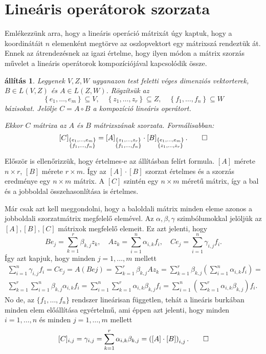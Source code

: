 \documentclass[9pt, a4paper, showtrims]{memoir}
\makeatletter
\renewenvironment{proof}[1][\proofname]
    {\par\pushQED{\qed}%
    \normalfont \topsep6\p@\@plus6\p@\relax
    \trivlist
    \item[\hskip\labelsep
        \itshape
    #1\@addpunct{:}]\ignorespaces}
    {\popQED\endtrivlist\@endpefalse}
\theoremstyle{plain}
\newtheorem{proposition}{állítás}[chapter]
\theoremstyle{remark}
\theoremstyle{definition}
\makeatother
\begin{document}
\section{Lineáris operátorok szorzata}
Emlékezzünk arra, hogy a lineáris operáció mátrixát úgy kaptuk, hogy a koordinátáit $n$ elemenként
megtörve az oszlopvektort egy mátrixszá rendeztük át.
Ennek az átrendezésnek az igazi értelme, hogy ilyen módon a mátrix szorzás művelet a lineáris operátorok kompozíciójával
kapcsolódik össze.
\begin{proposition}
	Legyenek $V,Z,W$ ugyanazon test feletti véges dimenziós vektorterek,
	$B \in L\left( V,Z \right)$ és $A \in L\left( Z,W \right)$.
	Rögzítsük az
	\[
		\left\{ e_1,\ldots,e_m \right\}\subseteq V,\quad
		\left\{ z_1,\ldots,z_r \right\}\subseteq Z,\quad
		\left\{ f_1,\ldots,f_n \right\}\subseteq W
	\]
	bázisokat.
	Jelölje $C=A\circ B$ a kompozíció lineáris operátort.

	Ekkor $C$ mátrixa az $A$ és $B$ mátrixszának szorzata.
	Formálisabban:
	\[
		\left[ C \right]_{\substack{\left\{ e_1,\ldots,e_m \right\}\\ \left\{ f_1,\ldots,f_n \right\}}}
		=
		\left[ A \right]_{\substack{\left\{ z_1,\ldots,z_r \right\}\\ \left\{ f_1,\ldots,f_n \right\}}}
		\cdot
		\left[ B \right]_{\substack{\left\{ e_1,\ldots,e_m \right\}\\ \left\{ z_1,\ldots,z_r \right\}}}.\qedhere
	\]
\end{proposition}
\begin{proof}
	Először is ellenőrizzük, hogy értelmes-e az állításban felírt formula.
	$\left[ A \right]$ mérete $n\times r$, $\left[ B \right]$ mérete $r\times m$.
	Így az $[A]\cdot[B]$ szorzat értelmes és a szorzás eredménye egy $n\times m$ mátrix.
	A $[C]$ szintén egy $n\times m$ méretű mátrix,
	így a bal és a jobboldal összehasonlítása is értelmes.

	Már csak azt kell meggondolni,
	hogy a baloldali mátrix minden eleme azonos a jobboldali szorzatmátrix megfelelő elemével.
	Az $\alpha,\beta,\gamma$ szimbólumokkal jelöljük az $[A],[B], [C]$ mátrixok megfelelő elemeit.
	Ez azt jelenti, hogy
	\[
		Be_j=\sum_{k=1}^r\beta_{k,j}z_k,\quad
		Az_k=\sum_{i=1}^n\alpha_{i,k}f_i,\quad
		Ce_j=\sum_{i=1}^n\gamma_{i,j}f_i.
	\]
	Így azt kapjuk, hogy minden $j=1,\ldots,m$ mellett
	\begin{multline*}
		\sum_{i=1}^n\gamma_{i,j}f_i
		=
		Ce_j
		=A\left( Bej \right)
		=
		\sum_{k=1}^r\beta_{k,j}Az_k
		=
		\sum_{k=1}^r\beta_{k,j}\left( \sum_{i=1}^n\alpha_{i,k}f_i \right)
		=\\
		\sum_{k=1}^r\sum_{i=1}^n\beta_{k,j}\alpha_{i,k}f_i
		=
		\sum_{i=1}^n\sum_{k=1}^r\alpha_{i,k}\beta_{k,j}f_i
		=
		\sum_{i=1}^n\left( \sum_{k=1}^r\alpha_{i,k}\beta_{k,j} \right)f_i.
	\end{multline*}
	No de, az $\{f_1,\ldots,f_n\}$ rendszer lineárisan független,
	tehát a lineáris burkában minden elem előállítása egyértelmű,
	ami éppen azt jelenti, hogy minden $i=1,\ldots,n$ és minden $j=1,\ldots,m$ mellett
	\[
		[C]_{i,j}=\gamma_{i,j}
		=\sum_{k=1}^r\alpha_{i,k}\beta_{k,j}
		=\left( \left[ A \right]\cdot\left[ B \right] \right)_{i,j}.\qedhere
	\]
\end{proof}
\end{document}
